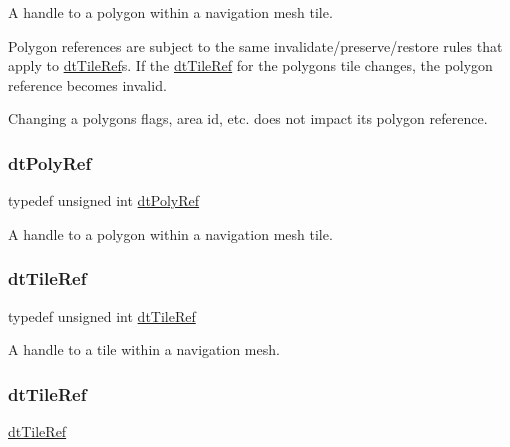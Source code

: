A handle to a polygon within a navigation mesh tile.

\begin{DoxyParagraph}{}

\end{DoxyParagraph}
Polygon references are subject to the same invalidate/preserve/restore rules that apply to \hyperlink{group__detour_ga7ea56cfe01bd7c34a81d821d94cbeea5}{dt\+Tile\+Ref}\textquotesingle{}s. If the \hyperlink{group__detour_ga7ea56cfe01bd7c34a81d821d94cbeea5}{dt\+Tile\+Ref} for the polygon\textquotesingle{}s tile changes, the polygon reference becomes invalid.

Changing a polygon\textquotesingle{}s flags, area id, etc. does not impact its polygon reference. \mbox{\label{group__detour_ga07c358f7bddf0fa2ef79e341a387c1dd}} 
\subsubsection{\texorpdfstring{dt\+Poly\+Ref}{dtPolyRef}\hspace{0.1cm}{\footnotesize\ttfamily [2/2]}}
{\footnotesize\ttfamily typedef unsigned int \hyperlink{group__detour_gab4e0b2257a670c1a800057999612b466}{dt\+Poly\+Ref}}

A handle to a polygon within a navigation mesh tile. \mbox{\label{group__detour_ga608138970cbb12594287ea6523be24ef}} 
\subsubsection{\texorpdfstring{dt\+Tile\+Ref}{dtTileRef}\hspace{0.1cm}{\footnotesize\ttfamily [1/2]}}
{\footnotesize\ttfamily typedef unsigned int \hyperlink{group__detour_ga7ea56cfe01bd7c34a81d821d94cbeea5}{dt\+Tile\+Ref}}

A handle to a tile within a navigation mesh. \mbox{\label{group__detour_ga7ea56cfe01bd7c34a81d821d94cbeea5}} 
\subsubsection{\texorpdfstring{dt\+Tile\+Ref}{dtTileRef}\hspace{0.1cm}{\footnotesize\ttfamily [2/2]}}
{\footnotesize\ttfamily \hyperlink{group__detour_ga7ea56cfe01bd7c34a81d821d94cbeea5}{dt\+Tile\+Ref}}

